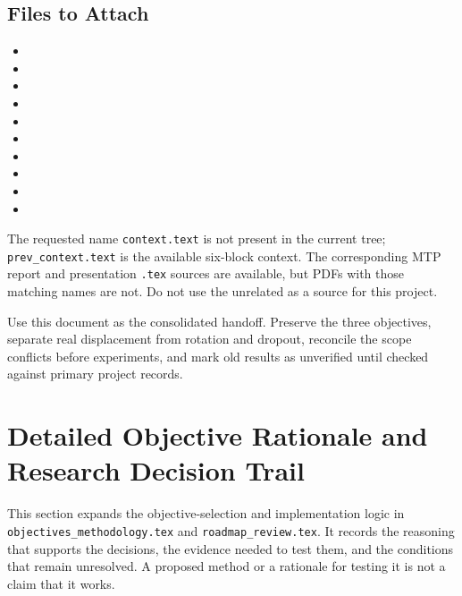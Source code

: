 \documentclass[10pt,a4paper]{article}
\begin{document}
\subsection{Files to Attach}
\begin{itemize}
\item {}
\item {}
\item {}
\item {}
\item {}
\item {}
\item {}
\item {}
\item {}
\item {}
\end{itemize}

The requested name \texttt{context.text} is not present in the current tree; \texttt{prev\_context.text} is the available six-block context. The corresponding MTP report and presentation \texttt{.tex} sources are available, but PDFs with those matching names are not. Do not use the unrelated  as a source for this project.

Use this document as the consolidated handoff. Preserve the three objectives, separate real displacement from rotation and dropout, reconcile the scope conflicts before experiments, and mark old results as unverified until checked against primary project records.

\clearpage
\section{Detailed Objective Rationale and Research Decision Trail}
This section expands the objective-selection and implementation logic in \texttt{objectives\_methodology.tex} and \texttt{roadmap\_review.tex}. It records the reasoning that supports the decisions, the evidence needed to test them, and the conditions that remain unresolved. A proposed method or a rationale for testing it is not a claim that it works.
\end{document}
